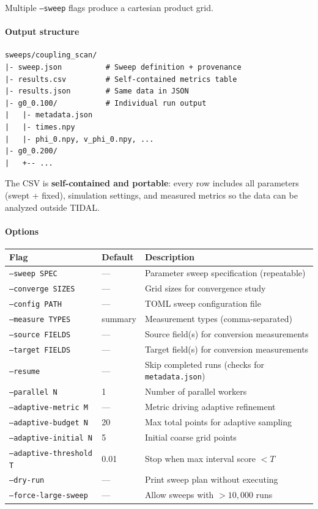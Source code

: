 Multiple \texttt{--sweep} flags produce a cartesian product grid.

\paragraph{Output structure}

\begin{lstlisting}
sweeps/coupling_scan/
|- sweep.json          # Sweep definition + provenance
|- results.csv         # Self-contained metrics table
|- results.json        # Same data in JSON
|- g0_0.100/           # Individual run output
|   |- metadata.json
|   |- times.npy
|   |- phi_0.npy, v_phi_0.npy, ...
|- g0_0.200/
|   +-- ...
\end{lstlisting}

The CSV is \textbf{self-contained and portable}: every row includes all parameters (swept + fixed), simulation settings, and measured metrics so the data can be analyzed outside TIDAL.

\paragraph{Options}

\begin{table}[htbp]
\centering
\begin{tabular}{@{}llp{5cm}@{}}
\toprule
Flag & Default & Description \\
\midrule
\texttt{--sweep SPEC}             & ---  & Parameter sweep specification (repeatable) \\
\texttt{--converge SIZES}         & ---  & Grid sizes for convergence study \\
\texttt{--config PATH}            & ---  & TOML sweep configuration file \\
\texttt{--measure TYPES}          & summary & Measurement types (comma-separated) \\
\texttt{--source FIELDS}          & ---  & Source field(s) for conversion measurements \\
\texttt{--target FIELDS}          & ---  & Target field(s) for conversion measurements \\
\texttt{--resume}                 & ---  & Skip completed runs (checks for \texttt{metadata.json}) \\
\texttt{--parallel N}             & 1    & Number of parallel workers \\
\texttt{--adaptive-metric M}      & ---  & Metric driving adaptive refinement \\
\texttt{--adaptive-budget N}      & 20   & Max total points for adaptive sampling \\
\texttt{--adaptive-initial N}     & 5    & Initial coarse grid points \\
\texttt{--adaptive-threshold T}   & 0.01 & Stop when max interval score $< T$ \\
\texttt{--dry-run}                & ---  & Print sweep plan without executing \\
\texttt{--force-large-sweep}      & ---  & Allow sweeps with $> 10{,}000$ runs \\
\bottomrule
\end{tabular}
\end{table}

